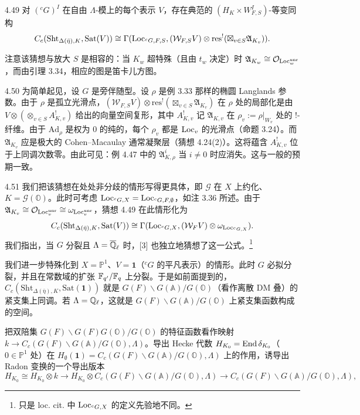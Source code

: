 \begin{conj}{4.49}\label{thm:a2-4-49}
对 $({}^{c}G)^I$ 在自由 $\Lambda$-模上的每个表示 $V$，存在典范的 $(H_K\times W^I_{F,S})$-等变同构
\[
C_c(\mathrm{Sht}_{\Delta(\bar\eta),K},\mathrm{Sat}(V))\cong\Gamma(\operatorname{Loc}_{{}^{c}G,F,S},(\mathcal W_{F,S}V)\otimes\mathrm{res}^!(\boxtimes_{v\in S}\mathfrak A_{K_v})).
\]
\end{conj}

注意该猜想与放大 $S$ 是相容的：当 $K_w$ 超特殊（且由 $t_w$ 决定）时 $\mathfrak A_{K_w}\cong\mathcal O_{\operatorname{Loc}^{\mathrm{unr}}_w}$，而由引理 3.34，相应的图是笛卡儿方图。

\begin{rem}{4.50}\label{thm:a2-4-50}
为简单起见，设 $G$ 是旁伴随型。设 $\rho$ 是例 3.33 那样的椭圆 Langlands 参数。由于 $\rho$ 是孤立光滑点，$(\mathcal W_{F,S}V)\otimes\mathrm{res}^!(\boxtimes_{v\in S}\mathfrak A_{K_v})$ 在 $\rho$ 处的局部化是由 $V\otimes(\otimes_{v\in S}A^!_{K,v})$ 给出的向量空间复形，其中 $A^!_{K,v}$ 记 $\mathfrak A_{K,v}$ 在 $\rho_v:=\rho|_{W_v}$ 处的 !-纤维。由于 $\mathrm{Ad}_\rho$ 是权为 $0$ 的纯的，每个 $\rho_v$ 都是 $\operatorname{Loc}_v$ 的光滑点（命题 3.24）。而 $\mathfrak A_{K_v}$ 应是极大的 Cohen–Macaulay 通常凝聚层（猜想 4.24(2)）。这将蕴含 $A^!_{K,v}$ 位于上同调次数零。由此可见：例 4.47 中的 $\mathfrak A^i_{K,\rho}$ 当 $i\ne0$ 时应消失。这与一般的预期一致。
\end{rem}

\begin{exam}{4.51}\label{thm:a2-4-51}
我们把该猜想在处处非分歧的情形写得更具体，即 $\mathcal G$ 在 $X$ 上约化、$K=\mathcal G(\mathbb O)$。此时可考虑 $\operatorname{Loc}_{{}^{c}G,X}=\operatorname{Loc}_{{}^{c}G,F,\emptyset}$，如注 3.36 所述。由于 $\mathfrak A_{K_v}\cong\mathcal O_{\operatorname{Loc}^{\mathrm{unr}}_v}\cong\omega_{\operatorname{Loc}^{\mathrm{unr}}_v}$，猜想 4.49 在此情形化为
\[
C_c(\mathrm{Sht}_{\Delta(\bar\eta),K},\mathrm{Sat}(V))\cong\Gamma(\operatorname{Loc}_{{}^{c}G,X},(\mathcal W_FV)\otimes\omega_{\operatorname{Loc}_{{}^{c}G,X}}).
\]
我们指出，当 $G$ 分裂且 $\Lambda=\overline{\mathbb{Q}}_\ell$ 时，[3] 也独立地猜想了这一公式。\footnote{只是 loc. cit. 中 $\operatorname{Loc}_{{}^{c}G,X}$ 的定义先验地不同。}
\end{exam}

我们进一步特殊化到 $X=\mathbb P^1$、$V=\mathbf 1$（${}^{c}G$ 的平凡表示）的情形。此时 $G$ 必拟分裂，并且在常数域的扩张 $\mathbb{F}_{q'}/\mathbb{F}_q$ 上分裂。于是如前面提到的，$C_c(\mathrm{Sht}_{\Delta(\bar\eta),K},\mathrm{Sat}(\mathbf 1))$ 就是 $G(F)\backslash G(\mathbb A)/G(\mathbb O)$（看作离散 DM 叠）的紧支集上同调。若 $\Lambda=\mathbb{Q}_\ell$，这就是 $G(F)\backslash G(\mathbb A)/G(\mathbb O)$ 上紧支集函数构成的空间。

把双陪集 $G(F)\backslash G(F)G(\mathbb O)/G(\mathbb O)$ 的特征函数看作映射 $k\to C_c(G(F)\backslash G(\mathbb A)/G(\mathbb O),\Lambda)$。导出 Hecke 代数 $H_{K_0}=\operatorname{End}\delta_{K_0}$（$0\in\mathbb P^1$ 处）在 $H_\emptyset(\mathbf 1)=C_c(G(F)\backslash G(\mathbb A)/G(\mathbb O),\Lambda)$ 上的作用，诱导出 Radon 变换的一个导出版本
\[
H_{K_0}\cong H_{K_0}\otimes k\to H_{K_0}\otimes C_c(G(F)\backslash G(\mathbb A)/G(\mathbb O),\Lambda)\to C_c(G(F)\backslash G(\mathbb A)/G(\mathbb O),\Lambda),
\]
